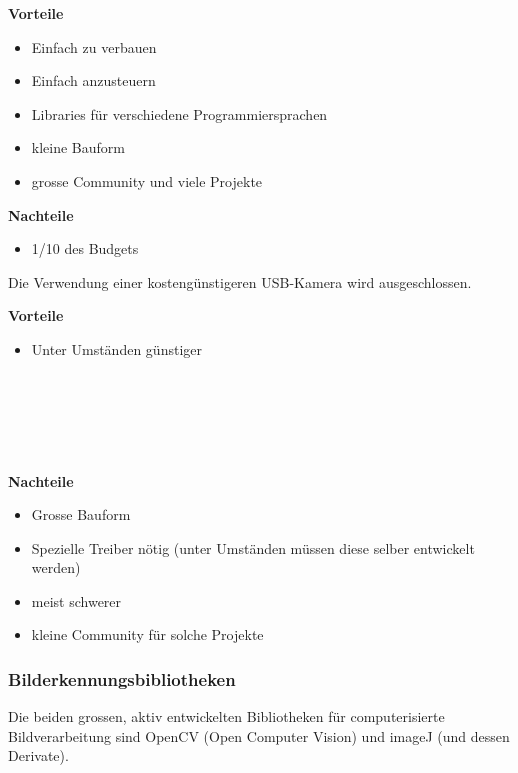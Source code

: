 \documentclass[a4paper]{report}
\begin{document}
\begin{multicols}{2}
	\textbf{Vorteile}
	\begin{itemize}[label={+},noitemsep]
		\item Einfach zu verbauen
		\item Einfach anzusteuern
		\item Libraries für verschiedene Programmiersprachen
		\item kleine Bauform
		\item grosse Community und viele Projekte
	\end{itemize}
	\columnbreak
	\textbf{Nachteile}
	\begin{itemize}[label={-},noitemsep]
		\item 1/10 des Budgets
	\end{itemize}
\end{multicols}

\noindent
Die Verwendung einer kostengünstigeren USB-Kamera wird ausgeschlossen.

\begin{multicols}{2}
	\textbf{Vorteile}
	\begin{itemize}[label={+},noitemsep]
		\item Unter Umständen günstiger
		\\
		\\
		\\
		\\
		\\
		\\
	\end{itemize}
	\columnbreak
	\textbf{Nachteile}
	\begin{itemize}[label={-},noitemsep]
		\item Grosse Bauform
		\item Spezielle Treiber nötig (unter Umständen müssen diese selber entwickelt werden)
		\item meist schwerer
		\item kleine Community für solche Projekte
	\end{itemize}
\end{multicols}

\subsubsection{Bilderkennungsbibliotheken}
Die beiden grossen, aktiv entwickelten Bibliotheken für computerisierte Bildverarbeitung sind OpenCV (Open Computer Vision) und imageJ (und dessen Derivate).
\end{document}
